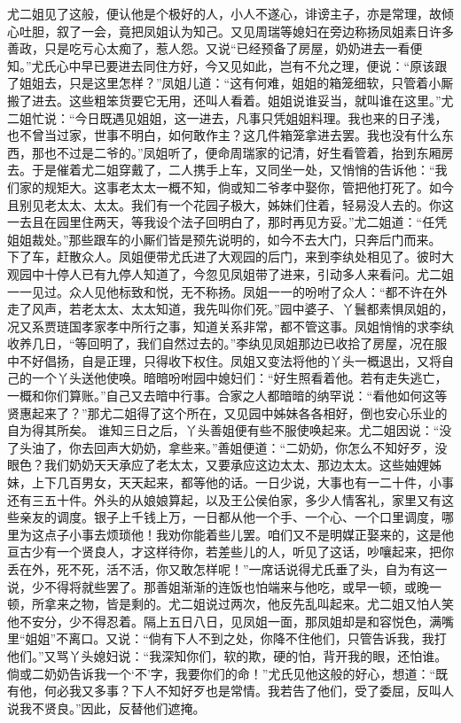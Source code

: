 \documentclass[12pt,oneside]{book}
\begin{document}
尤二姐见了这般，便认他是个极好的人，小人不遂心，诽谤主子，亦是常理，故倾心吐胆，叙了一会，竟把凤姐认为知己。又见周瑞等媳妇在旁边称扬凤姐素日许多善政，只是吃亏心太痴了，惹人怨。又说“已经预备了房屋，奶奶进去一看便知。”尤氏心中早已要进去同住方好，今又见如此，岂有不允之理，便说：“原该跟了姐姐去，只是这里怎样？”凤姐儿道：“这有何难，姐姐的箱笼细软，只管着小厮搬了进去。这些粗笨货要它无用，还叫人看着。姐姐说谁妥当，就叫谁在这里。”尤二姐忙说：“今日既遇见姐姐，这一进去，凡事只凭姐姐料理。我也来的日子浅，也不曾当过家，世事不明白，如何敢作主？这几件箱笼拿进去罢。我也没有什么东西，那也不过是二爷的。”凤姐听了，便命周瑞家的记清，好生看管着，抬到东厢房去。于是催着尤二姐穿戴了，二人携手上车，又同坐一处，又悄悄的告诉他：“我们家的规矩大。这事老太太一概不知，倘或知二爷孝中娶你，管把他打死了。如今且别见老太太、太太。我们有一个花园子极大，姊妹们住着，轻易没人去的。你这一去且在园里住两天，等我设个法子回明白了，那时再见方妥。”尤二姐道：“任凭姐姐裁处。”那些跟车的小厮们皆是预先说明的，如今不去大门，只奔后门而来。
下了车，赶散众人。凤姐便带尤氏进了大观园的后门，来到李纨处相见了。彼时大观园中十停人已有九停人知道了，今忽见凤姐带了进来，引动多人来看问。尤二姐一一见过。众人见他标致和悦，无不称扬。凤姐一一的吩咐了众人：“都不许在外走了风声，若老太太、太太知道，我先叫你们死。”园中婆子、丫鬟都素惧凤姐的，况又系贾琏国孝家孝中所行之事，知道关系非常，都不管这事。凤姐悄悄的求李纨收养几日，“等回明了，我们自然过去的。”李纨见凤姐那边已收拾了房屋，况在服中不好倡扬，自是正理，只得收下权住。凤姐又变法将他的丫头一概退出，又将自己的一个丫头送他使唤。暗暗吩咐园中媳妇们：“好生照看着他。若有走失逃亡，一概和你们算账。”自己又去暗中行事。合家之人都暗暗的纳罕说：“看他如何这等贤惠起来了？”那尤二姐得了这个所在，又见园中姊妹各各相好，倒也安心乐业的自为得其所矣。
谁知三日之后，丫头善姐便有些不服使唤起来。尤二姐因说：“没了头油了，你去回声大奶奶，拿些来。”善姐便道：“二奶奶，你怎么不知好歹，没眼色？我们奶奶天天承应了老太太，又要承应这边太太、那边太太。这些妯娌姊妹，上下几百男女，天天起来，都等他的话。一日少说，大事也有一二十件，小事还有三五十件。外头的从娘娘算起，以及王公侯伯家，多少人情客礼，家里又有这些亲友的调度。银子上千钱上万，一日都从他一个手、一个心、一个口里调度，哪里为这点子小事去烦琐他！我劝你能着些儿罢。咱们又不是明媒正娶来的，这是他亘古少有一个贤良人，才这样待你，若差些儿的人，听见了这话，吵嚷起来，把你丢在外，死不死，活不活，你又敢怎样呢！”一席话说得尤氏垂了头，自为有这一说，少不得将就些罢了。那善姐渐渐的连饭也怕端来与他吃，或早一顿，或晚一顿，所拿来之物，皆是剩的。尤二姐说过两次，他反先乱叫起来。尤二姐又怕人笑他不安分，少不得忍着。隔上五日八日，见凤姐一面，那凤姐却是和容悦色，满嘴里“姐姐”不离口。又说：“倘有下人不到之处，你降不住他们，只管告诉我，我打他们。”又骂丫头媳妇说：“我深知你们，软的欺，硬的怕，背开我的眼，还怕谁。倘或二奶奶告诉我一个‘不’字，我要你们的命！”尤氏见他这般的好心，想道：“既有他，何必我又多事？下人不知好歹也是常情。我若告了他们，受了委屈，反叫人说我不贤良。”因此，反替他们遮掩。
\end{document}
